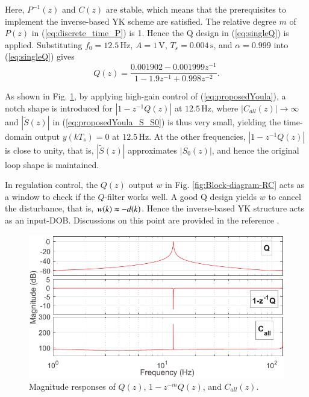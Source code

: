 \documentclass [11pt, proquest] {uwthesis}[2020/02/24]
\begin{document}
Here, $P^{-1}(z)$ and $C(z)$ are stable, which means that the prerequisites
to implement the inverse-based YK scheme are satisfied. The relative
degree $m$ of $P(z)$ in (\ref{eq:discrete_time_P}) is 1. Hence
the Q design in (\ref{eq:singleQ}) is applied. Substituting $f_{0}=12.5\,\text{Hz}$,
$A=1\,\text{V}$, $T_{s}=0.004\,\text{s}$, and $\alpha=0.999$ into
(\ref{eq:singleQ}) gives
\begin{equation}
Q(z)=\frac{0.001902-0.001999z^{-1}}{1-1.9z^{-1}+0.998z^{-2}}.\label{eq:singleQ-1}
\end{equation}

As shown in Fig. \ref{fig:Magnitude-responses-of-LS}, by applying high-gain
control of (\ref{eq:proposedYoula}), a notch shape is introduced
for $\left|1-z^{-1}Q(z)\right|$ at $12.5\,\text{Hz}$, where $\left|C_{all}(z)\right|\rightarrow\infty$
and $\left|\tilde{S}(z)\right|$ in (\ref{eq:proposedYoula_S_S0})
is thus very small, yielding the time-domain output $y(kT_{s})=0$
at $12.5\,\text{Hz}$. At the other frequencies, $\left|1-z^{-1}Q(z)\right|$
is close to unity, that is, $\left|\tilde{S}(z)\right|$ approximates
$\left|S_{0}(z)\right|$, and hence the original loop shape is maintained.

In regulation control, the $Q(z)$ output $w$ in Fig. \ref{fig:Block-diagram-RC} acts as a window to
check if the $Q$-filter works well. A good Q design yields $w$ to
cancel the disturbance, that is, $w(k)\thickapprox-d(k)$. Hence the
inverse-based YK structure acts as an input-DOB.
Discussions on this point are provided in the reference \cite{chen2014new}.
\begin{figure}[!ht]
\begin{centering}
\includegraphics[width=13cm]{Loop-shaping/Q_and_one_minus_zinvQ_2}
\par\end{centering}
\caption{\label{fig:Magnitude-responses-of-LS}Magnitude responses of $Q(z)$,
$1-z^{-m}Q(z)$, and $C_{all}(z)$.}
\end{figure}
\end{document}
